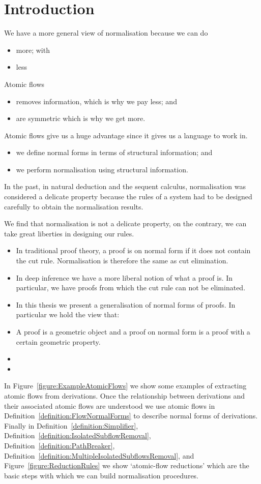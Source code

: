 \chapter{Introduction}

We have a more general view of normalisation because we can do
\begin{itemize}
\item more; with
\item less
\end{itemize}
Atomic flows
\begin{itemize}
\item removes information, which is why we pay less; and
\item are symmetric which is why we get more.
\end{itemize}

Atomic flows give us a huge advantage since it gives us a language to work in.

\begin{itemize}
\item we define normal forms in terms of structural information; and
\item we perform normalisation using structural information.
\end{itemize}

In the past, in natural deduction and the sequent calculus, normalisation was considered a delicate property because the rules of a system had to be designed carefully to obtain the normalisation results.

We find that normalisation is not a delicate property, on the contrary, we can take great liberties in designing our rules.
\begin{itemize}
\item
In traditional proof theory, a proof is on normal form if it does not contain the cut rule. Normalisation is therefore the same as cut elimination.
\item
In deep inference we have a more liberal notion of what a proof is. In particular, we have proofs from which the cut rule can not be eliminated.
\item
In this thesis we present a generalisation of normal forms of proofs. In particular we hold the view that:
\item
A proof is a geometric object and a proof on normal form is a proof with a certain geometric property.
\item
\item
\end{itemize}

In Figure~\vref{figure:ExampleAtomicFlows} we show some examples of extracting atomic flows from derivations. Once the relationship between derivations and their associated atomic flows are understood we use atomic flows in Definition~\vref{definition:FlowNormalForms} to describe normal forms of derivations. Finally in Definition~\vref{definition:Simplifier}, Definition~\vref{definition:IsolatedSubflowRemoval}, Definition~\vref{definition:PathBreaker}, Definition~\vref{definition:MultipleIsolatedSubflowsRemoval}, and Figure~\vref{figure:ReductionRules} we show `atomic-flow reductions' which are the basic steps with which we can build normalisation procedures.